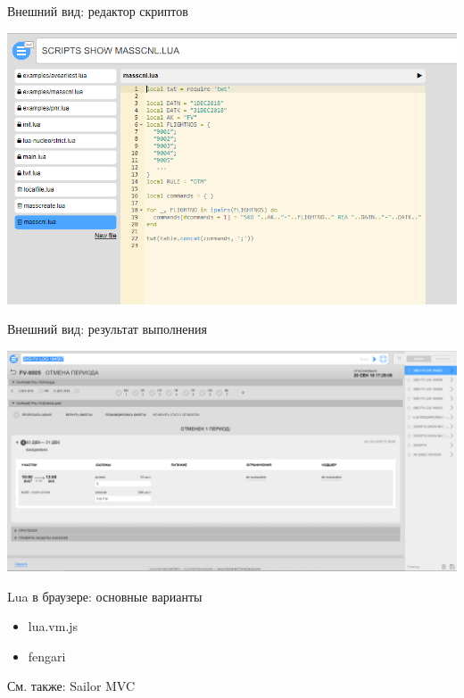 \documentclass[aspectratio=169,handout,bigger]{beamer}
\begin{document}

\begin{frame}{Внешний вид: редактор скриптов}

\includegraphics[width=.90\textwidth]{scripts}

\end{frame}


\begin{frame}{Внешний вид: результат выполнения}

\includegraphics[width=.90\textwidth]{result}

\end{frame}


\begin{frame}{Lua в браузере: основные варианты}

\begin{itemize}
\item lua.vm.js
\item fengari
\end{itemize}

См. также: Sailor MVC

\end{frame}
\end{document}
